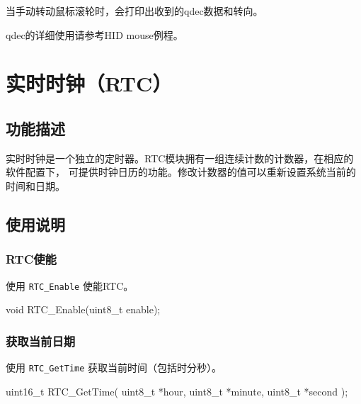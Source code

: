 \documentclass[
  12pt,
]{book}
\newenvironment{Shaded}{\begin{snugshade}}{\end{snugshade}}
\newcommand{\DataTypeTok}[1]{\textcolor[rgb]{0.13,0.29,0.53}{#1}}
\newcommand{\NormalTok}[1]{#1}
\begin{document}
当手动转动鼠标滚轮时，会打印出收到的qdec数据和转向。

qdec的详细使用请参考HID mouse例程。

\hypertarget{ch-rtc}{%
\chapter{实时时钟（RTC）}\label{ch-rtc}}

\hypertarget{ux529fux80fdux63cfux8ff0-6}{%
\section{功能描述}\label{ux529fux80fdux63cfux8ff0-6}}

实时时钟是一个独立的定时器。RTC模块拥有一组连续计数的计数器，在相应的软件配置下，
可提供时钟日历的功能。修改计数器的值可以重新设置系统当前的时间和日期。

\hypertarget{ux4f7fux7528ux8bf4ux660e-5}{%
\section{使用说明}\label{ux4f7fux7528ux8bf4ux660e-5}}

\hypertarget{rtcux4f7fux80fd}{%
\subsection{RTC使能}\label{rtcux4f7fux80fd}}

使用 \texttt{RTC\_Enable} 使能RTC。

\begin{Shaded}
\begin{Highlighting}[]
\DataTypeTok{void}\NormalTok{ RTC_Enable(}\DataTypeTok{uint8_t}\NormalTok{ enable);}
\end{Highlighting}
\end{Shaded}

\hypertarget{ux83b7ux53d6ux5f53ux524dux65e5ux671f}{%
\subsection{获取当前日期}\label{ux83b7ux53d6ux5f53ux524dux65e5ux671f}}

使用 \texttt{RTC\_GetTime} 获取当前时间（包括时分秒）。

\begin{Shaded}
\begin{Highlighting}[]
\DataTypeTok{uint16_t}\NormalTok{ RTC_GetTime(}
  \DataTypeTok{uint8_t}\NormalTok{ *hour, }
  \DataTypeTok{uint8_t}\NormalTok{ *minute, }
  \DataTypeTok{uint8_t}\NormalTok{ *second}
\NormalTok{  );}
\end{Highlighting}
\end{Shaded}
\end{document}
